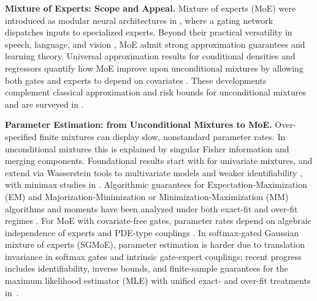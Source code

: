 \documentclass[twoside]{article}
\theoremstyle{plain}
\theoremstyle{definition}
\theoremstyle{plain}
\begin{document}
{\bf Mixture of Experts: Scope and Appeal.}
Mixture of experts (MoE) were introduced as modular neural architectures in \cite{jacobs_adaptive_1991,jordan_hierarchical_1994}, where a gating network dispatches inputs to specialized experts. Beyond their practical versatility in speech, language, and vision \citep{Shazeer_JMLR,pham_competesmoeeffective_2024,do_hyperrouter_2023,Eigen_learning_2014,bao_vlmo_2022,dosovitskiy_image_2021,liang_m3vit_2022,You_Speech_MoE,You_Speech_MoE_2,peng_bayesian_1996}, MoE admit strong approximation guarantees and learning theory. Universal approximation results for conditional densities and regressors quantify how MoE improve upon unconditional mixtures by allowing both gates and experts to depend on covariates \citep{norets_approximation_2010,nguyen_universal_2016,nguyen_approximation_2019_MoE,nguyen_approximations_2021}. These developments complement classical approximation and risk bounds for unconditional mixtures \citep{genovese_rates_2000,rakhlin_risk_2005,nguyen_approximation_2025,chong_risk_2024,nguyen_convergence_2013,shen_adaptive_2013,ho_convergence_2016,ho_strong_2016,nguyen_approximation_2020,nguyen_approximation_2023} and are surveyed in \citet{yuksel_twenty_2012,nguyen_practical_2018,nguyen_model_2021,chen_towards_2022}.

{\bf Parameter Estimation: from Unconditional Mixtures to MoE.}
Over-specified finite mixtures can display slow, nonstandard parameter rates. In unconditional mixtures this is explained by singular Fisher information and merging components. Foundational results start with \citet{chen_optimal_1995} for univariate mixtures, and extend via Wasserstein tools to multivariate models and weaker identifiability \citep{nguyen_convergence_2013,ho_convergence_2016}, with minimax studies in \citet{heinrich2018,Manole_2020}. Algorithmic guarantees for Expectation-Maximization (EM) and Majorization-Minimization or Minimization-Maximization (MM) algorithms and moments have been analyzed under both exact-fit and over-fit regimes \citep{Siva_2017,Anandkumar_moment_method,Hardt_mixture,Raaz_Ho_Koulik_2020,Raaz_Ho_Koulik_2018_second,wu2020a,doss_optimal_2023,Wu_minimax_EM,tran_revisiting_2026}. For MoE with covariate-free gates, parameter rates depend on algebraic independence of experts and PDE-type couplings \citep{ho_convergence_2022,do_strong_2025}. In softmax-gated Gaussian mixture of experts (SGMoE), parameter estimation is harder due to translation invariance in softmax gates and intrinsic gate-expert couplings; recent progress includes identifiability, inverse bounds, and finite-sample guarantees for the maximum likelihood
estimator (MLE) with unified exact- and over-fit treatments in~\citet{nguyen_demystifying_2023,nguyen_general_2024,nguyen_towards_2024}.
\end{document}
